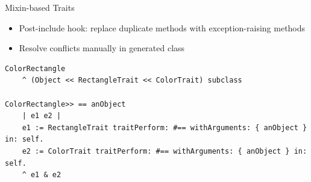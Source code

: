 \documentclass[xcolor=dvipsname, handout]{beamer} %
\begin{document}
\begin{frame}[fragile]{Mixin-based Traits}
\begin{itemize}
  \item Post-include hook: replace duplicate methods with exception-raising methods
  \item Resolve conflicts manually in generated class
\end{itemize}
\begin{lstlisting}
ColorRectangle
    ^ (Object << RectangleTrait << ColorTrait) subclass

ColorRectangle>> == anObject
    | e1 e2 |
    e1 := RectangleTrait traitPerform: #== withArguments: { anObject } in: self.
    e2 := ColorTrait traitPerform: #== withArguments: { anObject } in: self.
    ^ e1 & e2
\end{lstlisting}
\end{frame}


\end{document}

